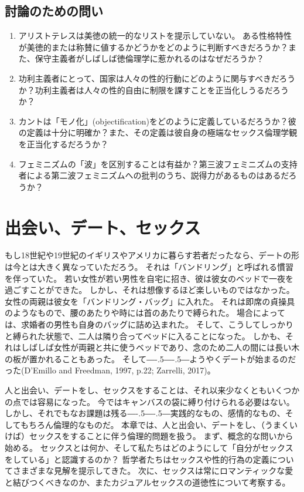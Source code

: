 \documentclass[paper=a4,book,openany]{jlreq}
\def\DDASH{―\kern-.5\zw―\kern-.5\zw―}
\begin{document}
\section{討論のための問い}
\begin{enumerate}
\item アリストテレスは美徳の統一的なリストを提示していない。
ある性格特性が美徳的または称賛に値するかどうかをどのように判断すべきだろうか？また、保守主義者がしばしば徳倫理学に惹かれるのはなぜだろうか？

    \item 功利主義者にとって、国家は人々の性的行動にどのように関与すべきだろうか？功利主義者は人々の性的自由に制限を課すことを正当化しうるだろうか？

    \item カントは「モノ化」(objectification)をどのように定義しているだろうか？彼の定義は十分に明確か？また、その定義は彼自身の極端なセックス倫理学観を正当化するだろうか？

    \item フェミニズムの「波」を区別することは有益か？第三波フェミニズムの支持者による第二波フェミニズムへの批判のうち、説得力があるものはあるだろうか？
\end{enumerate}

\chapter{出会い、デート、セックス}

もし18世紀や19世紀のイギリスやアメリカに暮らす若者だったなら、デートの形は今とは大きく異なっていただろう。
それは「バンドリング」と呼ばれる慣習を伴っていた。
若い女性が若い男性を自宅に招き、彼は彼女のベッドで一夜を過ごすことができた。
しかし、それは想像するほど楽しいものではなかった。
女性の両親は彼女を「バンドリング・バッグ」に入れた。
それは即席の貞操具のようなもので、腰のあたりや時には首のあたりで縛られた。
場合によっては、求婚者の男性も自身のバッグに詰め込まれた。
そして、こうしてしっかりと縛られた状態で、二人は隣り合ってベッドに入ることになった。
しかも、それはしばしば女性が両親と共に使うベッドであり、念のため二人の間には長い木の板が置かれることもあった。
そして{\DDASH}ようやくデートが始まるのだった(D'Emillo and Freedman, 1997, p.22; Zarrelli, 2017)。

\nocite{demilio97:_intim_matter}\nocite{zarrelli17:_awkwar_centur_datin}

人と出会い、デートをし、セックスをすることは、それ以来少なくともいくつかの点では容易になった。
今ではキャンバスの袋に縛り付けられる必要はない。
しかし、それでもなお課題は残る{\DDASH}実践的なもの、感情的なもの、そしてもちろん倫理的なものだ。
本章では、人と出会い、デートをし、（うまくいけば）セックスをすることに伴う倫理的問題を扱う。
まず、概念的な問いから始める。
セックスとは何か、そして私たちはどのようにして「自分がセックスをしている」と認識するのか？ 哲学者たちはセックスや性的行為の定義についてさまざまな見解を提示してきた。
次に、セックスは常にロマンティックな愛と結びつくべきなのか、またカジュアルセックスの道徳性について考察する。
\end{document}
